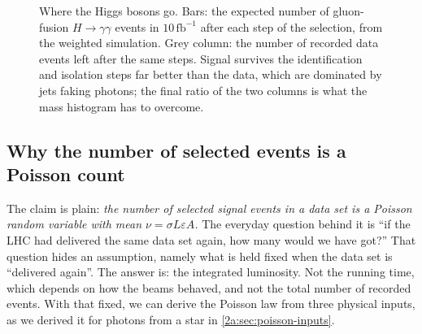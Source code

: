 \begin{figure}[htbp]
\centering
{}
\caption{Where the Higgs bosons go. Bars: the expected number of gluon-fusion $H\to\gamma\gamma$ events in $10\,\mathrm{fb^{-1}}$ after each step of the selection, from the weighted simulation. Grey column: the number of recorded data events left after the same steps. Signal survives the identification and isolation steps far better than the data, which are dominated by jets faking photons; the final ratio of the two columns is what the mass histogram has to overcome.}
\label{T4a:fig:cutflow}
\end{figure}

\subsection{Why the number of selected events is a Poisson count}
\label{T4a:sec:poisson}

The claim is plain: \emph{the number of selected signal events in a data set is a Poisson random variable with mean $\nu=\sigma L\varepsilon A$.} The everyday question behind it is ``if the LHC had delivered the same data set again, how many would we have got?'' That question hides an assumption, namely what is held fixed when the data set is ``delivered again''. The answer is: the integrated luminosity. Not the running time, which depends on how the beams behaved, and not the total number of recorded events. With that fixed, we can derive the Poisson law from three physical inputs, as we derived it for photons from a star in \cref{2a:sec:poisson-inputs}.

